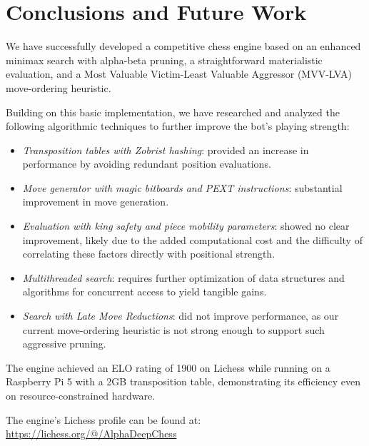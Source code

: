 \chapter{Conclusions and Future Work}

We have successfully developed a competitive chess engine based on an enhanced minimax search with alpha-beta pruning, a straightforward materialistic evaluation, and a Most Valuable Victim-Least Valuable Aggressor (MVV-LVA) move-ordering heuristic.

\vspace{1em}

\noindent Building on this basic implementation, we have researched and analyzed the following algorithmic techniques to further improve the bot's playing strength:

\begin{itemize}[itemsep=1pt]
    \item \textit{Transposition tables with Zobrist hashing}: provided an increase in performance by avoiding redundant position evaluations.
    \item \textit{Move generator with magic bitboards and PEXT instructions}: substantial improvement in move generation.
    
    \item \textit{Evaluation with king safety and piece mobility parameters}: showed no clear improvement, likely due to the added computational cost and the difficulty of correlating these factors directly with positional strength.
    \item \textit{Multithreaded search}: requires further optimization of data structures and algorithms for concurrent access to yield tangible gains.
    \item \textit{Search with Late Move Reductions}: did not improve performance, as our current move-ordering heuristic is not strong enough to support such aggressive pruning.
\end{itemize}

\noindent The engine achieved an ELO rating of 1900 on Lichess while running on a Raspberry Pi 5 with a 2GB transposition table, demonstrating its efficiency even on resource-constrained hardware.

\vspace{1em}

\noindent The engine's Lichess profile can be found at:\\
\url{https://lichess.org/@/AlphaDeepChess}

\vspace{1em}

